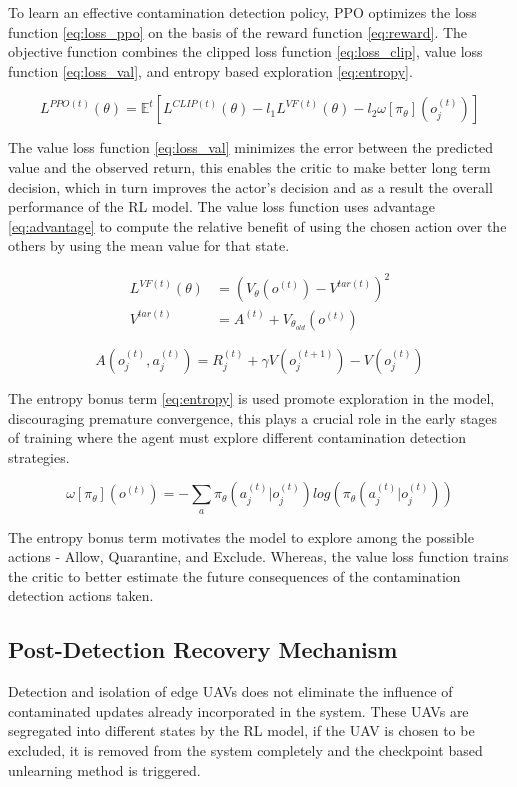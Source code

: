 \documentclass[10pt,journal,compsoc]{IEEEtran}
\begin{document}
To learn an effective contamination detection policy, PPO optimizes the loss function \eqref{eq:loss_ppo} on the basis of the reward function \eqref{eq:reward}. The objective function combines the clipped loss function \eqref{eq:loss_clip}, value loss function \eqref{eq:loss_val}, and entropy based exploration \eqref{eq:entropy}.

\begin{equation}\label{eq:loss_ppo}
L^{PPO (t)}(\theta)
=
\mathbb{E}^t[
L^{CLIP (t)}(\theta) -
l_1 L^{VF (t)}(\theta) -
l_2 \omega[\pi_\theta](o_j^{(t)})
]
\end{equation}

The value loss function \eqref{eq:loss_val} minimizes the error between the predicted value and the observed return, this enables the critic to make better long term decision, which in turn improves the actor's decision and as a result the overall performance of the RL model. The value loss function uses advantage \eqref{eq:advantage} to compute the relative benefit of using the chosen action over the others by using the mean value for that state.

\begin{align}\label{eq:loss_val}
L^{VF (t)}(\theta)
&=
(
V_\theta(o^{(t)}) -
V^{tar (t)}
)^2
\\
V^{tar (t)}
&=
A^{(t)} +
V_{\theta_{old}}(o^{(t)})
\end{align}

\begin{equation}\label{eq:advantage}
A(o_j^{(t)}, a_j^{(t)}) 
=
R_j^{(t)} +
\gamma V(o_j^{(t+1)}) - V(o_j^{(t)})
\end{equation}

The entropy bonus term \eqref{eq:entropy} is used promote exploration in the model, discouraging premature convergence, this plays a crucial role in the early stages of training where the agent must explore different contamination detection strategies.

\begin{equation}\label{eq:entropy}
\omega[\pi_\theta](o^{(t)}) 
=
-\sum_a 
\pi_\theta(a_j^{(t)}|o_j^{(t)})
log(\pi_\theta(a_j^{(t)}|o_j^{(t)}))
\end{equation}

The entropy bonus term motivates the model to explore among the possible actions - Allow, Quarantine, and Exclude. Whereas, the value loss function trains the critic to better estimate the future consequences of the contamination detection actions taken.


\subsection{Post-Detection Recovery Mechanism}
Detection and isolation of edge UAVs does not eliminate the influence of contaminated updates already incorporated in the system. These UAVs are segregated into different states by the RL model, if the UAV is chosen to be excluded, it is removed from the system completely and the checkpoint based unlearning method is triggered. 
\end{document}
